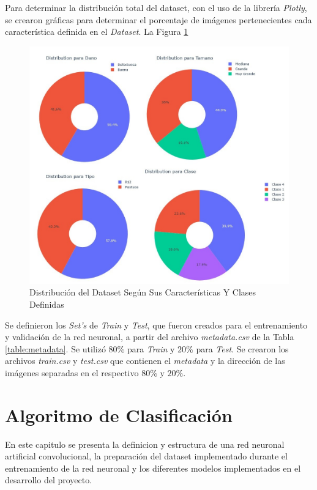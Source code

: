 	Para determinar la distribución total del dataset, con el uso de la librería \textit{Plotly}, se crearon gráficas para determinar el porcentaje de imágenes pertenecientes cada característica definida en el \textit{Dataset}. La Figura \ref{fig:distribuciontipo}
		
	\begin{figure}[ht]
		\centering
		\includegraphics[scale=0.4]{Figs/Distribucion.jpg}
		\caption{Distribución del Dataset Según Sus Características Y Clases Definidas}
		\label{fig:distribuciontipo}
	\end{figure}

	Se definieron los \textit{Set's} de \textit{Train} y \textit{Test}, que fueron creados para el entrenamiento y validación de la red neuronal, a partir del archivo \textit{metadata.csv} de la Tabla \ref{table:metadata}. Se utilizó $80\%$ para \textit{Train} y $20\%$ para \textit{Test}. Se crearon los archivos \textit{train.csv} y \textit{test.csv} que contienen el \textit{metadata} y la dirección de las imágenes separadas en el respectivo $80\%$ y $20\%$.



\chapter{Algoritmo de Clasificación}
En este capitulo se presenta la definicion y estructura de una red neuronal artificial convolucional, la preparación del dataset implementado durante el entrenamiento de la red neuronal y los diferentes modelos implementados en el desarrollo del proyecto.

